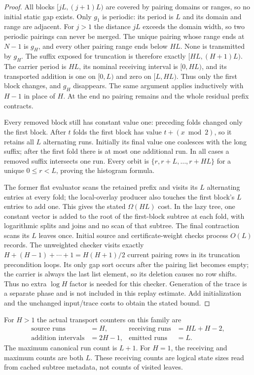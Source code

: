 \begin{proof}
All blocks $[jL,(j+1)L)$ are covered by pairing domains or ranges, so no
initial static gap exists. Only $g_1$ is periodic: its period is $L$ and its
domain and range are adjacent. For $j>1$ the distance $jL$ exceeds the domain
width, so two periodic pairings can never be merged. The unique pairing
whose range ends at $N-1$ is $g_H$, and every other pairing range ends below
$HL$. None is transmitted by $g_H$. The suffix exposed for truncation is
therefore exactly $[HL,(H+1)L)$. The carrier period is $HL$, its nominal
receiving interval is $[0,HL)$, and its transported addition is one on
$[0,L)$ and zero on $[L,HL)$. Thus only the first block changes, and
$g_H$ disappears.
The same argument applies inductively with $H-1$ in place of $H$. At the end
no pairing remains and the whole residual prefix contracts.

Every removed block still has constant value one: preceding folds changed
only the first block. After $t$ folds the first block has value
$t+(x\bmod2)$, so it retains all $L$ alternating runs. Initially its final
value one coalesces with the long suffix; after the first fold there is at
most one additional run. In all cases a removed suffix intersects one run.
Every orbit is $\{r,r+L,\ldots,r+HL\}$ for a unique $0\le r<L$, proving
the histogram formula.

The former flat evaluator scans the retained prefix and visits its $L$
alternating entries at every fold; the local-overlay producer also touches
the first block's $L$ entries to add one. This gives the stated
$\Omega(HL)$ cost.
In the lazy tree, one constant vector is added to the root of the first-block
subtree at each fold, with logarithmic splits and joins and no scan of that
subtree. The final contraction scans its $L$ leaves once. Initial source
and certificate-weight checks process $O(L)$ records. The unweighted
checker visits exactly $H+(H-1)+\cdots+1=H(H+1)/2$ current pairing rows
in its truncation precondition loops. Its only gap sort occurs after the
pairing list becomes empty; the carrier is always the last list element,
so its deletion causes no row shifts. Thus no extra $\log H$ factor is
needed for this checker. Generation of the trace is a separate phase and
is not included in this replay estimate. Add initialization and the
unchanged input/trace costs to obtain the stated bound.
\end{proof}

For $H>1$ the actual transport counters on this family are
\[
 \begin{aligned}
 \text{source runs}&=H,&
 \text{receiving runs}&=HL+H-2,\\
 \text{addition intervals}&=2H-1,&
 \text{emitted runs}&=L.
 \end{aligned}
\]
The maximum canonical run count is $L+1$. For $H=1$, the receiving and
maximum counts are both $L$. These receiving counts are logical state
sizes read from cached subtree metadata, not counts of visited leaves.

